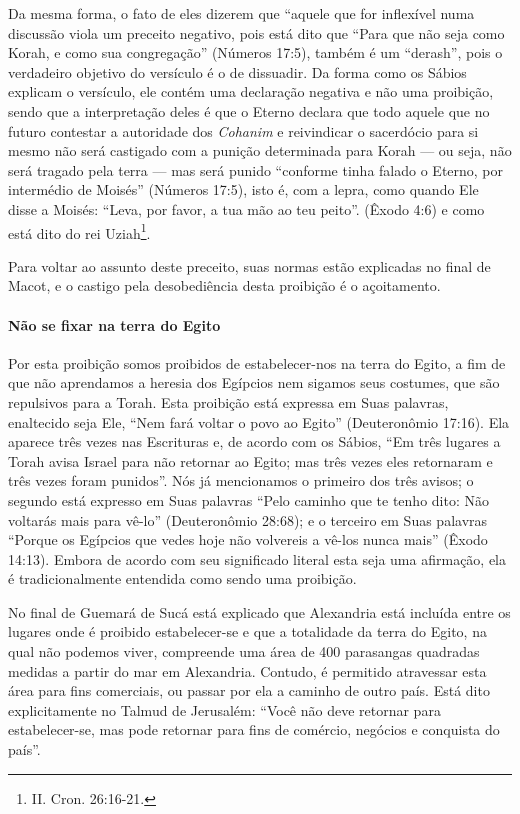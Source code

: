Da mesma forma, o fato de eles dizerem que ``aquele que for inflexível
numa discussão viola um preceito negativo, pois está dito que ``Para que
não seja como Korah, e como sua congregação'' (Números 17:5), também é
um ``derash'', pois o verdadeiro objetivo do versículo é o de dissuadir.
Da forma como os Sábios explicam o versículo, ele contém uma declaração
negativa e não uma proibição, sendo que a interpretação deles é que o
Eterno declara que todo aquele que no futuro contestar a autoridade dos
\textit{Cohanim} e reivindicar o sacerdócio para si mesmo não será castigado
com a punição determinada para Korah --- ou seja, não será tragado pela
terra --- mas será punido ``conforme tinha falado o Eterno, por
intermédio de Moisés'' (Números 17:5), isto é, com a lepra, como quando
Ele disse a Moisés: ``Leva, por favor, a tua mão ao teu peito''. (Êxodo
4:6) e como está dito do rei Uziah\footnote{II. Cron. 26:16-21.}.

Para voltar ao assunto deste preceito, suas normas estão explicadas no
final de Macot, e o castigo pela desobediência desta proibição é o
açoitamento.

\paragraph{Não se fixar na terra do Egito}

Por esta proibição somos proibidos de estabelecer-nos na terra do Egito,
a fim de que não aprendamos a heresia dos Egípcios nem sigamos seus
costumes, que são repulsivos para a Torah. Esta proibição está expressa
em Suas palavras, enaltecido seja Ele, ``Nem fará voltar o povo ao
Egito'' (Deuteronômio 17:16). Ela aparece três vezes nas Escrituras e, de acordo com os
Sábios, ``Em três lugares a Torah avisa Israel para não retornar ao
Egito; mas três vezes eles retornaram e três vezes foram punidos''. Nós
já mencionamos o primeiro dos três avisos; o segundo está expresso em
Suas palavras ``Pelo caminho que te tenho dito: Não voltarás mais para
vê-lo'' (Deuteronômio 28:68); e o terceiro em Suas palavras ``Porque os
Egípcios que vedes hoje não volvereis a vê-los nunca mais'' (Êxodo
14:13). Embora de acordo com seu significado literal esta seja uma
afirmação, ela é tradicionalmente entendida como sendo uma proibição.

No final de Guemará de Sucá está explicado que Alexandria está incluída
entre os lugares onde é proibido estabelecer-se e que a totalidade da
terra do Egito, na qual não podemos viver, compreende uma área de 400
parasangas quadradas medidas a partir do mar em Alexandria. Contudo, é
permitido atravessar esta área para fins comerciais, ou passar por ela a
caminho de outro país. Está dito explicitamente no Talmud de Jerusalém:
``Você não deve retornar para estabelecer-se, mas pode retornar para
fins de comércio, negócios e conquista do país''.

